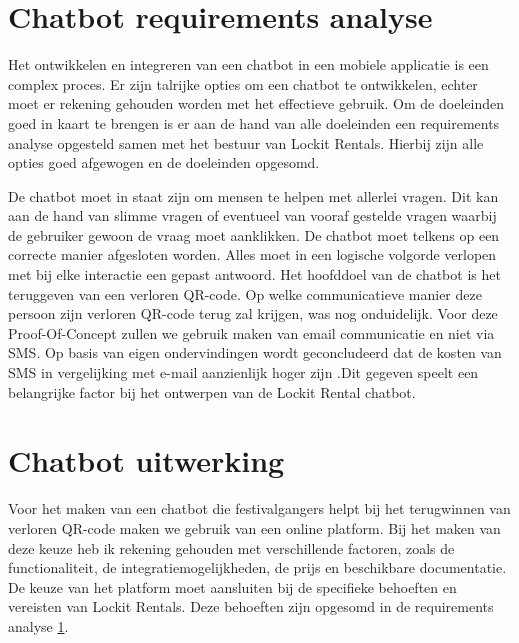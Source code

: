 \section{Chatbot requirements analyse}%
\label{sec:chatbotRequirment}

Het ontwikkelen en integreren van een chatbot in een mobiele applicatie is een complex proces. Er zijn talrijke opties om een chatbot te ontwikkelen, echter moet er rekening gehouden worden met het effectieve gebruik. Om de doeleinden goed in kaart te brengen is er aan de hand van alle doeleinden een requirements analyse opgesteld samen met het bestuur van Lockit Rentals. Hierbij zijn alle opties goed afgewogen en de doeleinden opgesomd.

De chatbot moet in staat zijn om mensen te helpen met allerlei vragen. Dit kan aan de hand van slimme vragen of eventueel van vooraf gestelde vragen waarbij de gebruiker gewoon de vraag moet aanklikken. De chatbot moet telkens op een correcte manier afgesloten worden. Alles moet in een logische volgorde verlopen met bij elke interactie een gepast antwoord. Het hoofddoel van de chatbot is het teruggeven van een verloren QR-code. Op welke communicatieve manier deze persoon zijn verloren QR-code terug zal krijgen, was nog onduidelijk. Voor deze Proof-Of-Concept zullen we gebruik maken van email communicatie en niet via SMS. Op basis van eigen ondervindingen wordt geconcludeerd dat de kosten van SMS in vergelijking met e-mail aanzienlijk hoger zijn \autocite{Paavola2023} .Dit gegeven speelt een belangrijke factor bij het ontwerpen van de Lockit Rental chatbot. 

\section{Chatbot uitwerking}%
\label{sec:chatbotUitwerking}

Voor het maken van een chatbot die festivalgangers helpt bij het terugwinnen van verloren QR-code maken we gebruik van een online platform. Bij het maken van deze keuze heb ik rekening gehouden met verschillende factoren, zoals de functionaliteit, de integratiemogelijkheden, de prijs en beschikbare documentatie. De keuze van het platform moet aansluiten bij de specifieke behoeften en vereisten van Lockit Rentals. Deze behoeften zijn opgesomd in de requirements analyse \ref{sec:chatbotRequirment}.

